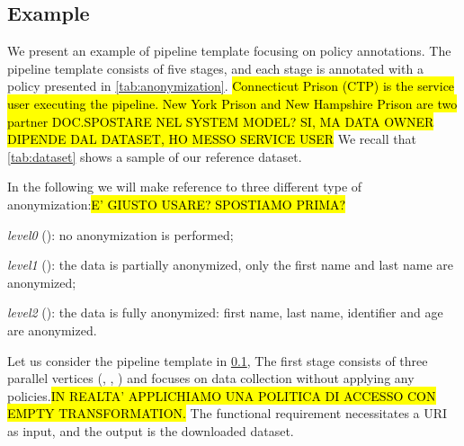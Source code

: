 \subsection{Example}\label{sec:example}
\newcommand{\pone}{$\langle service\_owner=dataset\_owner\rangle$}
\newcommand{\ptwo}{$\langle service\_owner=partner(dataset\_owner) \rangle$}
\newcommand{\pthree}{$\langle service\_owner \neq dataset\_owner AND owner \neq partner(dataset\_owner)$}


We present an example of pipeline template focusing on policy annotations. The pipeline template consists of five stages, and each stage is annotated with a policy presented in \cref{tab:anonymization}. \hl{Connecticut Prison (CTP) is the service user executing the pipeline. New York Prison and New Hampshire Prison are two partner DOC.}\hl{SPOSTARE NEL SYSTEM MODEL? SI, MA DATA OWNER DIPENDE DAL DATASET, HO MESSO SERVICE USER} We recall that \cref{tab:dataset} shows a sample of our reference dataset.

In the following we will make reference to three different type of anonymization:\hl{E' GIUSTO USARE}\hl{? SPOSTIAMO PRIMA?}
\begin{enumerate*}[label=\roman*)]
  \item \emph{level0} (): no anonymization is performed;
  \item \emph{level1} (): the data is partially anonymized, only the first name and last name are anonymized;
  \item \emph{level2} (): the data is fully anonymized: first name, last name, identifier and age are anonymized.
\end{enumerate*}

Let us consider the pipeline template \tChartFunction in \cref{sec:example},
The first stage consists of three parallel vertices (, , ) and focuses on data collection without applying any policies.\hl{IN REALTA' APPLICHIAMO UNA POLITICA DI ACCESSO CON EMPTY TRANSFORMATION.} The functional requirement necessitates a URI as input, and the output is the downloaded dataset.

